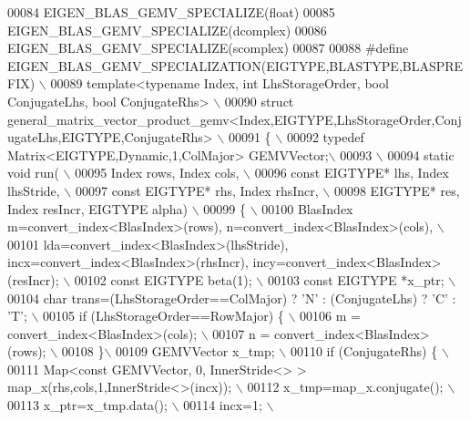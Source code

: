 \begin{DoxyCode}
00084 EIGEN\_BLAS\_GEMV\_SPECIALIZE(\textcolor{keywordtype}{float})
00085 EIGEN\_BLAS\_GEMV\_SPECIALIZE(dcomplex)
00086 EIGEN\_BLAS\_GEMV\_SPECIALIZE(scomplex)
00087 
00088 \textcolor{preprocessor}{#define EIGEN\_BLAS\_GEMV\_SPECIALIZATION(EIGTYPE,BLASTYPE,BLASPREFIX) \(\backslash\)}
00089 \textcolor{preprocessor}{template<typename Index, int LhsStorageOrder, bool ConjugateLhs, bool ConjugateRhs> \(\backslash\)}
00090 \textcolor{preprocessor}{struct general\_matrix\_vector\_product\_gemv<Index,EIGTYPE,LhsStorageOrder,ConjugateLhs,EIGTYPE,ConjugateRhs> 
      \(\backslash\)}
00091 \textcolor{preprocessor}{\{ \(\backslash\)}
00092 \textcolor{preprocessor}{typedef Matrix<EIGTYPE,Dynamic,1,ColMajor> GEMVVector;\(\backslash\)}
00093 \textcolor{preprocessor}{\(\backslash\)}
00094 \textcolor{preprocessor}{static void run( \(\backslash\)}
00095 \textcolor{preprocessor}{  Index rows, Index cols, \(\backslash\)}
00096 \textcolor{preprocessor}{  const EIGTYPE* lhs, Index lhsStride, \(\backslash\)}
00097 \textcolor{preprocessor}{  const EIGTYPE* rhs, Index rhsIncr, \(\backslash\)}
00098 \textcolor{preprocessor}{  EIGTYPE* res, Index resIncr, EIGTYPE alpha) \(\backslash\)}
00099 \textcolor{preprocessor}{\{ \(\backslash\)}
00100 \textcolor{preprocessor}{  BlasIndex m=convert\_index<BlasIndex>(rows), n=convert\_index<BlasIndex>(cols), \(\backslash\)}
00101 \textcolor{preprocessor}{            lda=convert\_index<BlasIndex>(lhsStride), incx=convert\_index<BlasIndex>(rhsIncr),
       incy=convert\_index<BlasIndex>(resIncr); \(\backslash\)}
00102 \textcolor{preprocessor}{  const EIGTYPE beta(1); \(\backslash\)}
00103 \textcolor{preprocessor}{  const EIGTYPE *x\_ptr; \(\backslash\)}
00104 \textcolor{preprocessor}{  char trans=(LhsStorageOrder==ColMajor) ? 'N' : (ConjugateLhs) ? 'C' : 'T'; \(\backslash\)}
00105 \textcolor{preprocessor}{  if (LhsStorageOrder==RowMajor) \{ \(\backslash\)}
00106 \textcolor{preprocessor}{    m = convert\_index<BlasIndex>(cols); \(\backslash\)}
00107 \textcolor{preprocessor}{    n = convert\_index<BlasIndex>(rows); \(\backslash\)}
00108 \textcolor{preprocessor}{  \}\(\backslash\)}
00109 \textcolor{preprocessor}{  GEMVVector x\_tmp; \(\backslash\)}
00110 \textcolor{preprocessor}{  if (ConjugateRhs) \{ \(\backslash\)}
00111 \textcolor{preprocessor}{    Map<const GEMVVector, 0, InnerStride<> > map\_x(rhs,cols,1,InnerStride<>(incx)); \(\backslash\)}
00112 \textcolor{preprocessor}{    x\_tmp=map\_x.conjugate(); \(\backslash\)}
00113 \textcolor{preprocessor}{    x\_ptr=x\_tmp.data(); \(\backslash\)}
00114 \textcolor{preprocessor}{    incx=1; \(\backslash\)}

\end{DoxyCode}
